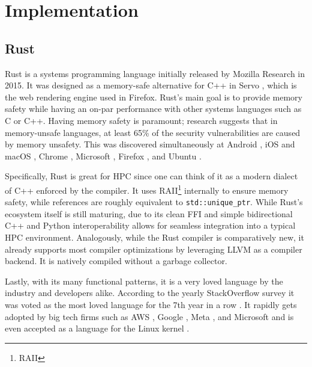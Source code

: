 \section{Implementation}

\subsection{Rust}
Rust \cite{noauthor_rust_nodate} is a systems programming language initially released by Mozilla Research in 2015. It was designed as a memory-safe alternative for C++ in Servo \cite{developers_servo_nodate}, which is the web rendering engine used in Firefox. Rust's main goal is to provide memory safety while having an on-par performance with other systems languages such as C or C++. Having memory safety is paramount; research suggests that in memory-unsafe languages, at least 65\% of the security vulnerabilities are caused by memory unsafety. This was discovered simultaneously at Android \cite{stepanov_detecting_2020} \cite{stoep_queue_2019}, iOS and macOS \cite{kehrer_memory_2019}, Chrome \cite{noauthor_memory_nodate}, Microsoft \cite{thomas_proactive_2019}, Firefox \cite{hosfelt_implications_2019}, and Ubuntu \cite{geoffrey_thomas_geofft_unofficial_2019}.

Specifically, Rust is great for \ac{HPC} since one can think of it as a modern dialect of C++ enforced by the compiler. It uses \acs{RAII}\footnote{\acf{RAII}} internally to ensure memory safety, while references are roughly equivalent to \texttt{std::unique\_ptr}. While Rust's ecosystem itself is still maturing, due to its clean \ac{FFI} and simple bidirectional C++ \cite{you_bindgen_2023} and Python \cite{pyo3_project_and_contributors_pyo3_2023} interoperability allows for seamless integration into a typical \ac{HPC} environment. Analogously, while the Rust compiler is comparatively new, it already supports most compiler optimizations by leveraging \ac{LLVM} as a compiler backend. It is natively compiled without a garbage collector.

Lastly, with its many functional patterns, it is a very loved language by the industry and developers alike. According to the yearly StackOverflow survey it was voted as the most loved language for the 7th year in a row \cite{noauthor_stack_2023}. It rapidly gets adopted by big tech firms such as AWS \cite{asay_why_2020}, Google \cite{noauthor_welcome_nodate}, Meta \cite{garcia_programming_2022}, and Microsoft \cite{jirehl_microsoft_2022} and is even accepted as a language for the Linux kernel \cite{claburn_linus_2022}.

